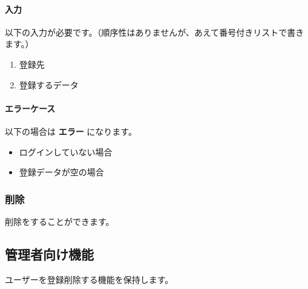 \documentclass[11pt,a4j]{ltjsarticle}
\let\oldparagraph\paragraph
\renewcommand{\paragraph}[1]{\oldparagraph{#1}\mbox{}}
\begin{document}
\paragraph{入力}\label{ux5165ux529b}

以下の入力が必要です。（順序性はありませんが、あえて番号付きリストで書きます。）

\begin{enumerate}
\def\labelenumi{\arabic{enumi}.}
\itemsep1pt\parskip0pt
\item
  登録先
\item
  登録するデータ
\end{enumerate}

\paragraph{エラーケース}\label{ux30a8ux30e9ux30fcux30b1ux30fcux30b9}

以下の場合は \textbf{エラー} になります。

\begin{itemize}
\itemsep1pt\parskip0pt
\item
  ログインしていない場合
\item
  登録データが空の場合
\end{itemize}

\subsubsection{削除}\label{function-delete}

削除をすることができます。

\subsection{管理者向け機能}\label{ux7ba1ux7406ux8005ux5411ux3051ux6a5fux80fd}

ユーザーを登録削除する機能を保持します。
\end{document}
